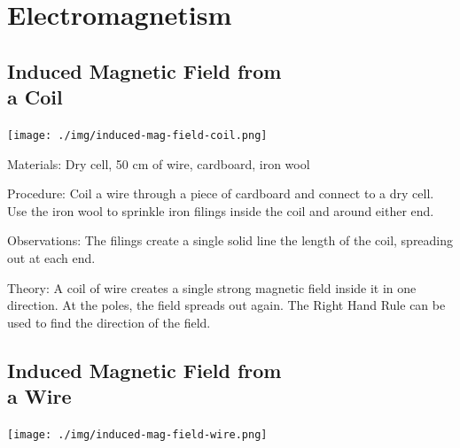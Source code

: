 \section{Electromagnetism}

\begin{multicols}{2}


\subsection[Induced Magnetic Field from a Coil]{Induced Magnetic Field from \hfill \\ a Coil}

\begin{center}
\texttt{[image: ./img/induced-mag-field-coil.png]}
\end{center}

\begin{description*}
\item[Materials:]{Dry cell, 50 cm of wire, cardboard, iron wool}
\item[Procedure:]{Coil a wire through a piece of cardboard and connect to a dry cell. Use the iron wool to sprinkle iron filings inside the coil and around either end.}
\item[Observations:]{The filings create a single solid line the length of the coil, spreading out at each end.}
\item[Theory:]{A coil of wire creates a single strong magnetic field inside it in one direction. At the poles, the field spreads out again. The Right Hand Rule can be used to find the direction of the field.}
\end{description*}

\subsection[Induced Magnetic Field from a Wire]{Induced Magnetic Field from \hfill \\ a Wire}

\begin{center}
\texttt{[image: ./img/induced-mag-field-wire.png]}
\end{center}


\end{multicols}
